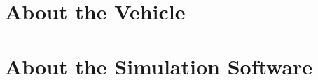 \section{About the Vehicle}
\label{sec:previous_knowledge_vehicle}



\section{About the Simulation Software}
\label{sec:previous_knowledge_ezsystems}
